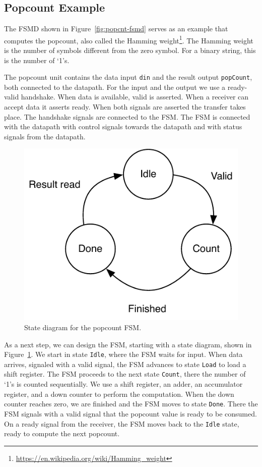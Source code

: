 \documentclass[%
    10pt,
    headinclude, footexclude,
    openright, %
    notitlepage,
    cleardoubleempty,
    headsepline,
    pointlessnumbers,
    bibtotoc, idxtotoc,
    ]{scrbook}
\newcommand{\code}[1]{{\small{\texttt{#1}}}}
\newcommand{\scale}{0.7}
\newcommand{\myref}[2]{\href{#1}{#2}}
\renewcommand{\myref}[2]{{#2}{\footnote{\url{#1}}}}
\begin{document}
\subsection{Popcount Example}

The FSMD shown in Figure~\ref{fig:popcnt-fsmd} serves as an example that computes the
popcount, also called the \myref{https://en.wikipedia.org/wiki/Hamming_weight}{Hamming weight}.
The Hamming weight is the number of symbols different from the zero symbol.
For a binary string, this is the number of `1's.

The popcount unit contains the data input \code{din} and the result output \code{popCount},
both connected to the datapath. For the input and the output we use a ready-valid handshake.
When data is available, valid is asserted. When a receiver can accept data it asserts ready.
When both signals are asserted the transfer takes place. The handshake signals are connected
to the FSM. The FSM is connected with the datapath with control signals towards the datapath
and with status signals from the datapath.

\begin{figure}
  \centering
  \includegraphics[scale=\scale]{figures/popcnt-states}
  \caption{State diagram for the popcount FSM.}
  \label{fig:popcnt-states}
\end{figure}

As a next step, we can design the FSM, starting with a state diagram, shown in
Figure~\ref{fig:popcnt-states}. We start in state \code{Idle}, where the FSM waits
for input. When data arrives, signaled with a valid signal, the FSM advances to state \code{Load}
to load a shift register. The FSM proceeds to the next state \code{Count}, there the number
of `1's is counted sequentially. We use a shift register, an adder, an accumulator
register, and a down counter to perform the computation. When the down counter reaches
zero, we are finished and the FSM moves to state \code{Done}. There the FSM signals with a valid
signal that the popcount value is ready to be consumed. On a ready signal from the
receiver, the FSM moves back to the \code{Idle} state, ready to compute the next popcount.
\end{document}

